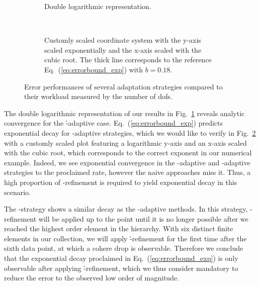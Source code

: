 \begin{figure}
\centering
\begin{subfigure}{1\textwidth}
  \centering
  
  \caption{Double logarithmic representation.} %
  \label{fig:errordofsloglog}
\end{subfigure} \\
\vspace{1em}
\begin{subfigure}{1\textwidth}
  \centering
  
  \caption{Customly scaled coordinate system with the y-axis scaled exponentially and the x-axis scaled with the cubic root. The thick line corresponds to the reference Eq.~(\ref{eq:errorbound_exp}) with $b = 0.18$.}
  \label{fig:errordofscustom}
\end{subfigure}
\caption[Error performances of several adaptation strategies compared to their workload measured by the number of .]{Error performances of several adaptation strategies compared to their workload measured by the number of \glspl{dof}.}
\label{fig:errordofs}
\end{figure}

The double logarithmic representation of our results in Fig.~\ref{fig:errordofsloglog} reveals analytic convergence for the \h-adaptive case.
Eq.~(\ref{eq:errorbound_exp}) predicts exponential decay for \hp-adaptive strategies, which we would like to verify in Fig.~\ref{fig:errordofscustom} with a customly scaled plot featuring a logarithmic y-axis and an x-axis scaled with the cubic root, which corresponds to the correct exponent in our numerical example. Indeed, we see exponential convergence in the \p-adaptive and \hp-adaptive strategies to the proclaimed rate, however the naive approaches miss it. Thus, a high proportion of \p-refinement is required to yield exponential decay in this scenario.

The \p-strategy shows a similar decay as the \hp-adaptive methods.
In this strategy, \p-refinement will be applied up to the point until it is no longer possible after we reached the highest order element in the hierarchy. With six distinct finite elements in our collection, we will apply \h-refinement for the first time after the sixth data point, at which a cohere drop is observable. Therefore we conclude that the exponential decay proclaimed in Eq.~(\ref{eq:errorbound_exp}) is only observable after applying \h-refinement, which we thus consider mandatory to reduce the error to the observed low order of magnitude.


